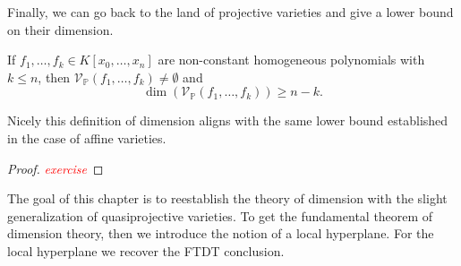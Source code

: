 \documentclass[40pt]{article}
\newcommand{\Proj}{\mathbb{P}}
\newcommand{\V}{\mathcal{V}}
\newcommand{\note}[1]{\textcolor{red}{\emph{#1}}}
\theoremstyle{remark}
\begin{document}
		Finally, we can go back to the land of projective varieties and give a lower bound on their dimension. 
		\begin{prop}
			If $f_1,\dots,f_k \in K[x_0,\dots,x_n]$ are non-constant homogeneous polynomials with $k \leq n$, then $\V_\Proj(f_1,\dots,f_k) \neq \emptyset$ and 
			\[
			\dim(\V_\Proj(f_1,\dots,f_k)) \geq n - k.
			\]
		\end{prop}
		Nicely this definition of dimension aligns with the same lower bound established in the case of affine varieties. 
		\begin{proof}
			\note{exercise}
		\end{proof}
		\begin{summary}
			The goal of this chapter is to reestablish the theory of dimension with the slight generalization of quasiprojective varieties. To get the fundamental theorem of dimension theory, then we introduce the notion of a local hyperplane. For the local hyperplane we recover the FTDT conclusion. 
		\end{summary}
\end{document}
